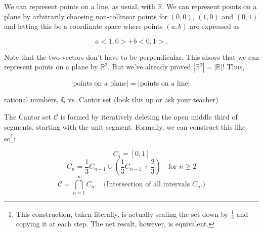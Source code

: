 \documentclass[../gatm_answers.tex]{subfiles}
\begin{document}
We can represent points on a line, as usual, with $\mathbb{R}$. We can represent points on a plane by arbitrarily choosing non-collinear points for $(0,0)$, $(1,0)$ and $(0,1)$ and letting this be a coordinate space where points $(a,b)$ are expressed as

$$a<1,0>+b<0,1>.$$

Note that the two vectors don't have to be perpendicular. This shows that we can represent points on a plane by $\mathbb{R}^2$. But we've already proved $\left|\mathbb{R}^2\right| = |\mathbb{R}|$! Thus,

$$\left|\text{points on a plane}\right| = |\text{points on a line}|.$$

\begin{inner_problem}
\item rational numbers, $\mathbb{Q}$ vs. Cantor set (look this up or ask your teacher)
\end{inner_problem}

The Cantor set $\mathcal{C}$ is formed by iteratively deleting the open middle third of segments, starting with the unit segment. Formally, we can construct this like so\footnote{This construction, taken literally, is actually scaling the set down by $\frac{1}{3}$ and copying it at each step. The net result, however, is equivalent.}:

$$C_1=[0,1]$$
$$C_n=\frac{1}{3} C_{n-1} \cup \left(\frac{1}{3} C_{n-1} + \frac{2}{3}\right) \quad \text{for }n\geq 2$$
$$\mathcal{C}=\bigcap_{n=1}^{\infty} C_n. \quad \text{(Intersection of all intervals }C_n\text{.)}$$
\end{document}
